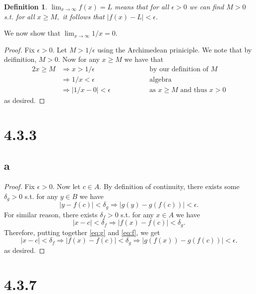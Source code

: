 \documentclass[10pt]{article}
\newtheorem{definition}[]{Definition}
\begin{document}
\begin{definition}
    $\lim_{x\to\infty}f(x)=L$ means that for all $\epsilon>0$ we can find $M>0$ s.t. for all $x\ge M,$ it follows that $|f(x)-L|<\epsilon.$
\end{definition}

\noindent
We now show that $\lim_{x\to\infty}1/x=0.$
\begin{proof}
    Fix $\epsilon>0$. Let $M >1/\epsilon$ using the Archimedean priniciple. We note that by deifinition, $M>0.$ Now for any $x\ge M$ we have that
    \begin{alignat*}{2}
        x\ge M &\Rightarrow x > 1/\epsilon &&\text{by our definition of }M\\
        & \Rightarrow1/x < \epsilon&&\text{algebra}\\
        & \Rightarrow|1/x - 0| < \epsilon \qquad\qquad&&\text{as }x\ge M \text{ and thus }x>0 
    \end{alignat*}
    as desired.
\end{proof}
 
\section*{4.3.3}

\subsection*{a}

\begin{proof}
    Fix $\epsilon > 0.$ Now let $c\in A.$ By definition of continuity, there exists some $\delta_g > 0$ s.t. for any $y\in B$ we have
    \begin{equation} \label{eq:g}
        |y-f(c)|<\delta_g \Rightarrow |g(y)-g(f(c))|<\epsilon.
    \end{equation}
    For similar reason, there exists $\delta_f > 0$ s.t. for any $x\in A$ we have
    \begin{equation} \label{eq:f}
        |x-c|<\delta_f \Rightarrow |f(x)-f(c)|<\delta_g.
    \end{equation}
    Therefore, putting together \eqref{eq:g} and \eqref{eq:f}, we get
    \begin{equation*}
        |x-c|<\delta_f \Rightarrow |f(x)-f(c)|<\delta_g \Rightarrow |g(f(x))-g(f(c))|<\epsilon.
    \end{equation*}
    as desired.
\end{proof}

\section*{4.3.7}
\end{document}
